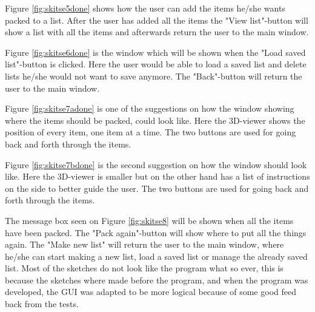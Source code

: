 Figure \ref{fig:skitse5done} shows how the user can add the items he/she wants packed to a list. After the user has added all the items the "View list"-button will show a list with all the items and afterwards return the user to the main window.


Figure \ref{fig:skitse6done} is the window which will be shown when the "Load saved list"-button is clicked. Here the user would be able to load a saved list and delete lists he/she would not want to save anymore. The "Back"-button will return the user to the main window.


Figure \ref{fig:skitse7adone} is one of the suggestions on how the window showing where the items should be packed, could look like. Here the 3D-viewer shows the position of every item, one item at a time. The two buttons are used for going back and forth through the items.


Figure \ref{fig:skitse7bdone} is the second suggestion on how the window should look like. Here the 3D-viewer is smaller but on the other hand has a list of instructions on the side to better guide the user. The two buttons are used for going back and forth through the items.


The message box seen on Figure \ref{fig:skitse8} will be shown when all the items have been packed. The "Pack again"-button will show where to put all the things again. The "Make new list" will return the user to the main window, where he/she can start making a new list, load a saved list or manage the already saved list. Most of the sketches do not look like the program what so ever, this is because the sketches where made before the program, and when the program was developed, the GUI was adapted to be more logical because of some good feed back from the tests.

